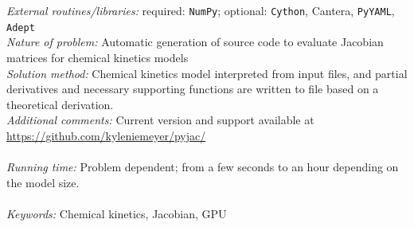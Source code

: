 \documentclass[preprint,12pt]{elsarticle}
\begin{document}
\begin{small}
{\em External routines/libraries:} required: \texttt{NumPy}; optional: \texttt{Cython}, Cantera, \texttt{PyYAML}, \texttt{Adept} \\
{\em Nature of problem:} Automatic generation of source code to evaluate Jacobian matrices for chemical kinetics models \\
{\em Solution method:} Chemical kinetics model interpreted from input files, and partial derivatives and necessary supporting functions are written to file based on a theoretical derivation.\\
{\em Additional comments:} Current version and support available at \url{https://github.com/kyleniemeyer/pyjac/}\\
   \\
{\em Running time:} Problem dependent; from a few seconds to an hour depending on the model size. \\
 \\ 
{\em Keywords:} Chemical kinetics, Jacobian, GPU 
  
\end{small}
\end{document}
